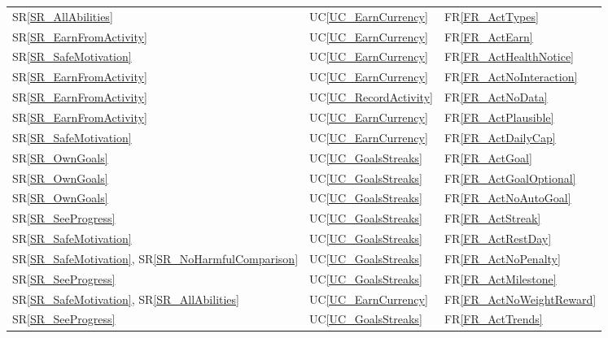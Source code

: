 \documentclass[12pt]{article}
\newcommand{\srref}[1]{SR\ref{#1}}
\newcommand{\ucref}[1]{UC\ref{#1}}
\newcommand{\rref}[1]{FR\ref{#1}}
\begin{document}
\begin{longtable}{p{} p{} p{}}
\srref{SR_AllAbilities} & \ucref{UC_EarnCurrency} & \rref{FR_ActTypes} \\
\srref{SR_EarnFromActivity} & \ucref{UC_EarnCurrency} & \rref{FR_ActEarn} \\
\srref{SR_SafeMotivation} & \ucref{UC_EarnCurrency} & \rref{FR_ActHealthNotice} \\
\srref{SR_EarnFromActivity} & \ucref{UC_EarnCurrency} & \rref{FR_ActNoInteraction} \\
\srref{SR_EarnFromActivity} & \ucref{UC_RecordActivity} & \rref{FR_ActNoData} \\
\srref{SR_EarnFromActivity} & \ucref{UC_EarnCurrency} & \rref{FR_ActPlausible} \\
\srref{SR_SafeMotivation} & \ucref{UC_EarnCurrency} & \rref{FR_ActDailyCap} \\
\srref{SR_OwnGoals} & \ucref{UC_GoalsStreaks} & \rref{FR_ActGoal} \\
\srref{SR_OwnGoals} & \ucref{UC_GoalsStreaks} & \rref{FR_ActGoalOptional} \\
\srref{SR_OwnGoals} & \ucref{UC_GoalsStreaks} & \rref{FR_ActNoAutoGoal} \\
\srref{SR_SeeProgress} & \ucref{UC_GoalsStreaks} & \rref{FR_ActStreak} \\
\srref{SR_SafeMotivation} & \ucref{UC_GoalsStreaks} & \rref{FR_ActRestDay} \\
\srref{SR_SafeMotivation}, \srref{SR_NoHarmfulComparison} & \ucref{UC_GoalsStreaks} & \rref{FR_ActNoPenalty} \\
\srref{SR_SeeProgress} & \ucref{UC_GoalsStreaks} & \rref{FR_ActMilestone} \\
\srref{SR_SafeMotivation}, \srref{SR_AllAbilities} & \ucref{UC_EarnCurrency} & \rref{FR_ActNoWeightReward} \\
\srref{SR_SeeProgress} & \ucref{UC_GoalsStreaks} & \rref{FR_ActTrends} \\


\end{longtable}
\end{document}
